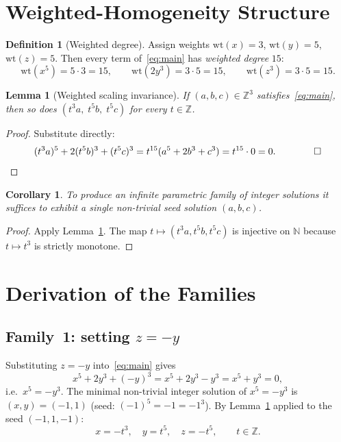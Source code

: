 \documentclass[12pt,a4paper]{article}
\newtheorem{lemma}[theorem]{Lemma}
\newtheorem{corollary}[theorem]{Corollary}
\theoremstyle{definition}
\newtheorem{definition}[theorem]{Definition}
\newcommand{\Z}{\mathbb{Z}}
\newcommand{\N}{\mathbb{N}}
\begin{document}
\section{Weighted-Homogeneity Structure}\label{sec:structure}

\begin{definition}[Weighted degree]
  Assign weights $\mathrm{wt}(x) = 3$, $\mathrm{wt}(y) = 5$, $\mathrm{wt}(z) = 5$.
  Then every term of~\eqref{eq:main} has \emph{weighted degree} $15$:
  \[
    \mathrm{wt}(x^5) = 5 \cdot 3 = 15, \qquad
    \mathrm{wt}(2y^3) = 3 \cdot 5 = 15, \qquad
    \mathrm{wt}(z^3) = 3 \cdot 5 = 15.
  \]
\end{definition}

\begin{lemma}[Weighted scaling invariance]\label{lem:scale}
  If $(a, b, c) \in \Z^3$ satisfies~\eqref{eq:main}, then so does
  $(t^3 a,\; t^5 b,\; t^5 c)$ for every $t \in \Z$.
\end{lemma}

\begin{proof}
  Substitute directly:
  \[
    (t^3 a)^5 + 2(t^5 b)^3 + (t^5 c)^3
    = t^{15}(a^5 + 2b^3 + c^3) = t^{15} \cdot 0 = 0. \qquad\qed
  \]
\end{proof}

\begin{corollary}
  To produce an infinite parametric family of integer solutions it suffices to
  exhibit a single non-trivial \emph{seed} solution $(a, b, c)$.
\end{corollary}

\begin{proof}
  Apply Lemma~\ref{lem:scale}.  The map $t \mapsto (t^3 a, t^5 b, t^5 c)$ is
  injective on $\N$ because $t \mapsto t^3$ is strictly monotone.
\end{proof}

\section{Derivation of the Families}\label{sec:derivation}

\subsection{Family~1: setting $z = -y$}\label{sec:fam1}

Substituting $z = -y$ into~\eqref{eq:main} gives
\[
  x^5 + 2y^3 + (-y)^3 = x^5 + 2y^3 - y^3 = x^5 + y^3 = 0,
\]
i.e.\ $x^5 = -y^3$.  The minimal non-trivial integer solution of $x^5 = -y^3$ is
$(x, y) = (-1, 1)$ (seed: $(-1)^5 = -1 = -1^3$).  By Lemma~\ref{lem:scale}
applied to the seed $(-1, 1, -1)$:
\[
  x = -t^3,\quad y = t^5,\quad z = -t^5, \qquad t \in \Z.
\]
\end{document}
